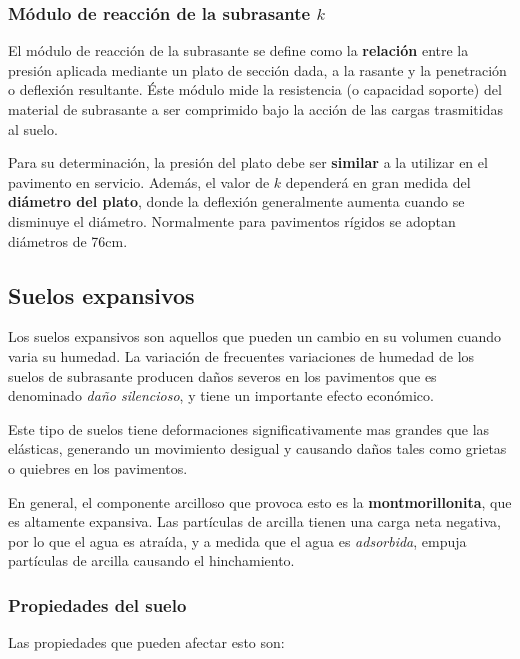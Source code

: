 \documentclass[../main.tex]{subfiles}
\begin{document}
\subsubsection{Módulo de reacción de la subrasante $k$}

El módulo de reacción de la subrasante se define como la \textbf{relación} entre
la presión aplicada mediante un plato de sección dada, a la rasante y la penetración
o deflexión resultante. Éste módulo mide la resistencia (o capacidad soporte) del
material de subrasante a ser comprimido bajo la acción de las cargas trasmitidas
al suelo.

Para su determinación, la presión del plato debe ser \textbf{similar} a la utilizar
en el pavimento en servicio. Además, el valor de $k$ dependerá en gran medida
del \textbf{diámetro del plato}, donde la deflexión generalmente aumenta cuando
se disminuye el diámetro. Normalmente para pavimentos rígidos se adoptan 
diámetros de 76cm.


\subsection{Suelos expansivos}

Los suelos expansivos son aquellos que pueden un cambio en su volumen cuando
varia su humedad. La variación de frecuentes variaciones de humedad de los suelos
de subrasante producen daños severos en los pavimentos que es denominado
\textit{daño silencioso}, y tiene un importante efecto económico.

Este tipo de suelos tiene deformaciones significativamente mas grandes que las 
elásticas, generando un movimiento desigual y causando daños tales como grietas
o quiebres en los pavimentos. 

En general, el componente arcilloso que provoca esto es la 
\textbf{montmorillonita}, que es altamente expansiva.  Las partículas de arcilla
tienen una carga neta negativa, por lo que el agua es atraída, y a medida que 
el agua es \textit{adsorbida}, empuja partículas de arcilla
causando el hinchamiento.

\subsubsection{Propiedades del suelo}

Las propiedades que pueden afectar esto son:
\end{document}
